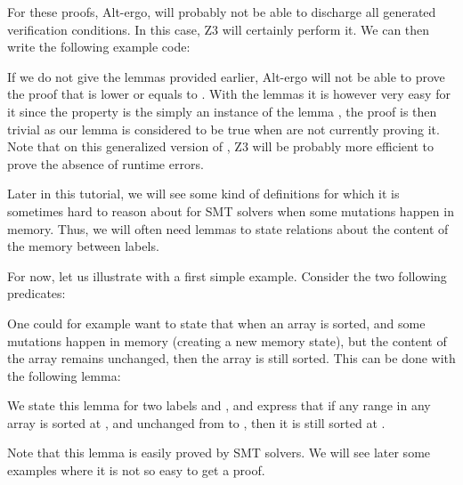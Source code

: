 


For these proofs, Alt-ergo, will probably not be able to discharge all
generated verification conditions. In this case, Z3 will certainly perform
it. We can then write the following example code:






If we do not give the lemmas provided earlier, Alt-ergo will not be able
to prove the proof that  is lower or equals to
. With the lemmas it is however very easy for it since the
property is the simply an instance of the lemma
, the proof is then trivial as our lemma is
considered to be true when are not currently proving it. Note that on this
generalized version of , Z3 will be probably more efficient
to prove the absence of runtime errors.




Later in this tutorial, we will see some kind of definitions for which it is
sometimes hard to reason about for SMT solvers when some mutations happen in
memory. Thus, we will often need lemmas to state relations about the content
of the memory between labels.


For now, let us illustrate with a first simple example. Consider the two following
predicates:




One could for example want to state that when an array is sorted, and some
mutations happen in memory (creating a new memory state), but the content of the
array remains unchanged, then the array is still sorted. This can be done with
the following lemma:




We state this lemma for two labels  and , and
express that if any range in any array is sorted at , and
unchanged from  to , then it is still sorted at
.


Note that this lemma is easily proved by SMT solvers. We will see later some
examples where it is not so easy to get a proof.






